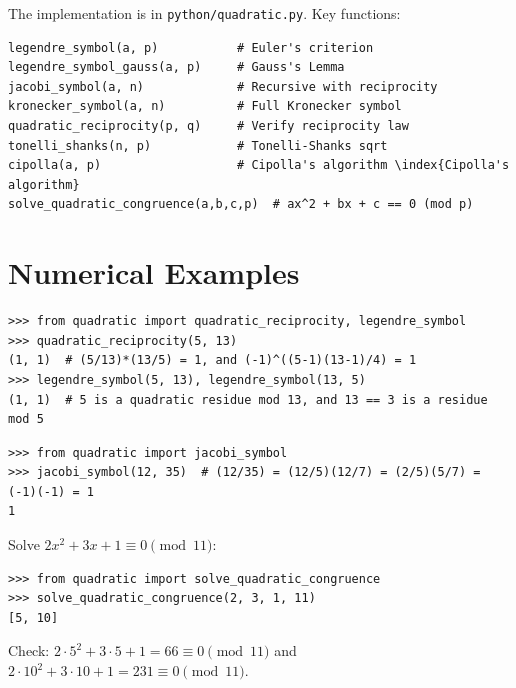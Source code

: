 The implementation is in \texttt{python/quadratic.py}. Key functions:

\begin{lstlisting}[style=python, caption={Key functions in python/quadratic.py}]
legendre_symbol(a, p)           # Euler's criterion
legendre_symbol_gauss(a, p)     # Gauss's Lemma
jacobi_symbol(a, n)             # Recursive with reciprocity
kronecker_symbol(a, n)          # Full Kronecker symbol
quadratic_reciprocity(p, q)     # Verify reciprocity law
tonelli_shanks(n, p)            # Tonelli-Shanks sqrt
cipolla(a, p)                   # Cipolla's algorithm \index{Cipolla's algorithm}
solve_quadratic_congruence(a,b,c,p)  # ax^2 + bx + c == 0 (mod p)
\end{lstlisting}

\section{Numerical Examples}

\begin{example}
\begin{lstlisting}[style=python]
>>> from quadratic import quadratic_reciprocity, legendre_symbol
>>> quadratic_reciprocity(5, 13)
(1, 1)  # (5/13)*(13/5) = 1, and (-1)^((5-1)(13-1)/4) = 1
>>> legendre_symbol(5, 13), legendre_symbol(13, 5)
(1, 1)  # 5 is a quadratic residue mod 13, and 13 == 3 is a residue mod 5
\end{lstlisting}
\end{example}

\begin{example}
\begin{lstlisting}[style=python]
>>> from quadratic import jacobi_symbol
>>> jacobi_symbol(12, 35)  # (12/35) = (12/5)(12/7) = (2/5)(5/7) = (-1)(-1) = 1
1
\end{lstlisting}
\end{example}

\begin{example}
Solve $2x^2 + 3x + 1 \equiv 0 \pmod{11}$:
\begin{lstlisting}[style=python]
>>> from quadratic import solve_quadratic_congruence
>>> solve_quadratic_congruence(2, 3, 1, 11)
[5, 10]
\end{lstlisting}
Check: $2\cdot 5^2 + 3\cdot 5 + 1 = 66 \equiv 0 \pmod{11}$ and $2\cdot 10^2 + 3\cdot 10 + 1 = 231 \equiv 0 \pmod{11}$.
\end{example}

